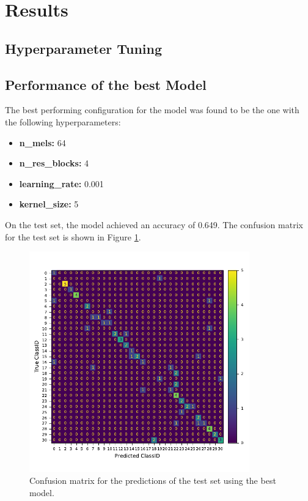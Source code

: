 


\section{Results}
\label{section3}

\subsection{Hyperparameter Tuning}



\subsection{Performance of the best Model}

The best performing configuration for the model was found to be the one with the following hyperparameters:

\begin{itemize}
    \item \textbf{n\_mels:} 64
    \item \textbf{n\_res\_blocks:} 4
    \item \textbf{learning\_rate:} 0.001
    \item \textbf{kernel\_size:} 5
\end{itemize}

On the test set, the model achieved an accuracy of 0.649. 
The confusion matrix for the test set is shown in Figure \ref{fig:confusion_matrix_best}.


\begin{figure}[h!]
    \centering
    \captionsetup{width=.7\linewidth}
    \includegraphics[width=0.85\textwidth]{figures/confusion_matrix_best.pdf}
    \caption{Confusion matrix for the predictions of the test set using the best model.}
    \label{fig:confusion_matrix_best}
\end{figure}